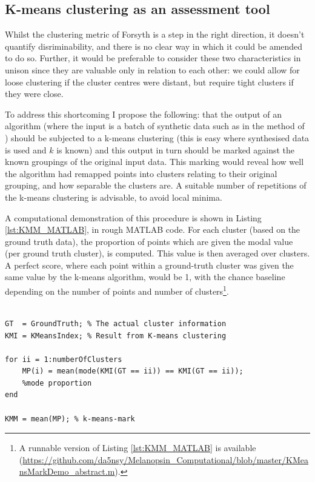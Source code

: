 \subsection{K-means clustering as an assessment tool}

Whilst the clustering metric of Forsyth is a step in the right direction, it doesn't quantify disriminability, and there is no clear way in which it could be amended to do so. Further, it would be preferable to consider these two characteristics in unison since they are valuable only in relation to each other: we could allow for loose clustering if the cluster centres were distant, but require tight clusters if they were close. 

To address this shortcoming I propose the following: that the output of an algorithm (where the input is a batch of synthetic data such as in the method of \citet{barnard_comparison_2002}) should be subjected to a k-means clustering (this is easy where synthesised data is used and $k$ is known) and this output in turn should be marked against the known groupings of the original input data. This marking would reveal how well the algorithm had remapped points into clusters relating to their original grouping, and how separable the clusters are. A suitable number of repetitions of the k-means clustering is advisable, to avoid local minima. 

A computational demonstration of this procedure is shown in Listing \ref{lst:KMM_MATLAB}, in rough \gls{MATLAB} code. For each cluster (based on the ground truth data), the proportion of points which are given the modal value (per ground truth cluster), is computed. This value is then averaged over clusters. A perfect score, where each point within a ground-truth cluster was given the same value by the k-means algorithm, would be 1, with the chance baseline depending on the number of points and number of clusters\footnote{A runnable version of Listing \ref{lst:KMM_MATLAB} is available (\url{https://github.com/da5nsy/Melanopsin_Computational/blob/master/KMeansMarkDemo_abstract.m}).}. 

\begin{lstlisting}[style = Matlab-editor, basicstyle = \mlttfamily, float = htbp, caption = Abstracted MATLAB code showing the k-means-mark computation, label = lst:KMM_MATLAB ]

GT  = GroundTruth; % The actual cluster information
KMI = KMeansIndex; % Result from K-means clustering

for ii = 1:numberOfClusters
    MP(i) = mean(mode(KMI(GT == ii)) == KMI(GT == ii)); 
    %mode proportion
end

KMM = mean(MP); % k-means-mark

\end{lstlisting}



